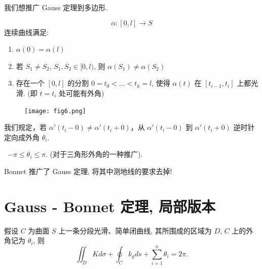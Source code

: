 \documentclass[lang=cn,10pt,thmcnt=section]{elegantbook}
\begin{document}
我们想推广 Gauss 定理到多边形.
\begin{definition}[分段光滑简单闭合曲线)]
    $$ \alpha: [0, l] \to S $$
连续曲线满足:
\begin{enumerate}
    \item $\alpha(0) = \alpha(l)$
    \item 若 $S_1 \neq S_2$, $S_1, S_2 \in [0, l)$, 则 $\alpha(S_1) \neq \alpha(S_2)$
    \item 存在一个 $[0, l]$ 的分割 $0=t_0 < \dots < t_k = l$, 使得 $\alpha(t)$ 在 $[t_{i-1}, t_i]$ 上都光滑. (即 $t=t_i$ 处可能有外角)
\end{enumerate}
\end{definition}
\begin{figure}[h]
    \centering
    \texttt{[image: fig6.png]} %
\end{figure}
\begin{definition}[外角]
    我们规定，若 $\alpha'(t_i-0) \ne \alpha'(t_i+0)$，从 $\alpha'(t_i-0)$ 到 $\alpha'(t_i+0)$ 逆时针定向成外角 $\theta_i$.

\textbullet \ $-\pi \le \theta_i \le \pi$. (对于三角形外角的一种推广).
\end{definition}

Bonnet 推广了 Gauss 定理, 将其中测地线的要求去掉!
\section{Gauss - Bonnet 定理, 局部版本}
\begin{theorem}
    假设 $C$ 为曲面 $S$ 上一条分段光滑、简单闭曲线,
其所围成的区域为 $D$, $C$ 上的外角记为 $\theta_i$, 则
$$ \iint_D K d\sigma + \oint_C k_g ds + \sum_{i=1}^n \theta_i = 2\pi. $$
\end{theorem}
\end{document}
